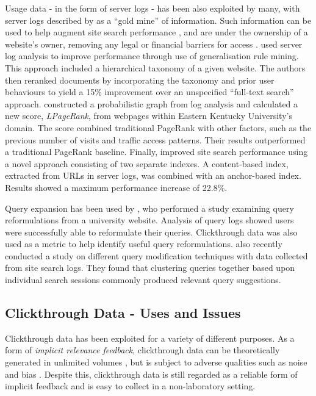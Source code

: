 Usage data - in the form of server logs - has been also exploited by many, with server logs described by \citeauthor{guo2009click_chain} \cite{guo2009click_chain} as a ``gold mine'' of information. Such information can be used to help augment site search performance \cite{ding2007log_based_site_search}, and are under the ownership of a website's owner, removing any legal or financial barriers for access \cite{cui2005web_logs_site_search}. \citeauthor{xue2002log_mining} \cite{xue2002log_mining} used server log analysis to improve performance through use of generalisation rule mining. This approach included a hierarchical taxonomy of a given website. The authors then reranked documents by incorporating the taxonomy and prior user behaviours to yield a 15\% improvement over an unspecified ``full-text search'' approach. \citeauthor{cui2005web_logs_site_search} \cite{cui2005web_logs_site_search} constructed a probabilistic graph from log analysis and calculated a new score, \emph{LPageRank}, from webpages within Eastern Kentucky University's domain. The score combined traditional PageRank with other factors, such as the previous number of visits and traffic access patterns. Their results outperformed a traditional PageRank baseline. Finally, \citeauthor{ding2007log_based_site_search} \cite{ding2007log_based_site_search} improved site search performance using a novel approach consisting of two separate indexes. A content-based index, extracted from URLs in server logs, was combined with an anchor-based index. Results showed a maximum performance increase of 22.8\%.

Query expansion has been used by \citeauthor{albakour2012query_reformulations_local} \cite{albakour2012query_reformulations_local}, who performed a study examining query reformulations from a university website. Analysis of query logs showed users were successfully able to reformulate their queries. Clickthrough data was also used as a metric to help identify useful query reformulations. \citeauthor{kruchwitz2013query_suggestions} \cite{kruchwitz2013query_suggestions} also recently conducted a study on different query modification techniques with data collected from site search logs. They found that clustering queries together based upon individual search sessions commonly produced relevant query suggestions.

\subsection{Clickthrough Data - Uses and Issues}\label{sec:background_clickthrough}
Clickthrough data has been exploited for a variety of different purposes. As a form of \emph{implicit relevance feedback}, clickthrough data can be theoretically generated in unlimited volumes \cite{joachims2002optimizing_clickthrough}, but is subject to adverse qualities such as noise and bias \cite{kelly2004time_implicit}. Despite this, clickthrough data is still regarded as a reliable form of implicit feedback \cite{joachims2005clickthrough} and is easy to collect in a non-laboratory setting.

